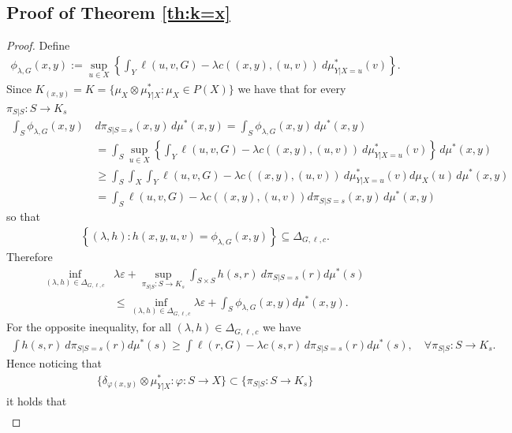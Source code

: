\documentclass{article}
\newcommand{\D}{\Delta_{G,\ell, c}}
\newcommand{\phifix}{\phi_{\lambda, G}}
\theoremstyle{definition}
\theoremstyle{remarksty}
\begin{document}
\subsection{Proof of Theorem \ref{th:k=x}}\label{supp:p(x)-duality-proof}
\begin{proof}
Define 
\begin{align*}
\phifix (x,y) := \sup_{u \in X} \left\{\int_Y \ell (u, v, G) - \lambda c((x,y),(u,v))\ d\mu_{Y|X=u}^*(v) \right\}.
\end{align*}
Since $K_{(x,y)} = K = \{\mu_X \otimes \mu^*_{Y|X}: \mu_X \in P(X)\}$ we have that for every $\pi_{S|S} : S \rightarrow K_s$ 
\begin{align*}
    \int_S \phifix (x,y) \, & d\pi_{S|S=s}(x,y) \,d\mu^*(x,y)  = \int_S \phifix (x,y)\,d\mu^*(x,y) \\
    & = \int_S \sup_{u \in X} \left\{\int_Y \ell (u, v, G) - \lambda c((x,y),(u,v))\ d\mu_{Y|X=u}^*(v) \right\} \,d\mu^*(x,y)\\
    & \geq \int_S \int_X\int_Y \ell (u, v, G) - \lambda c((x,y),(u,v))\ d\mu_{Y|X=u}^*(v)  d\mu_X(u)\,d\mu^*(x,y)\\
    & = \int_S  \ell (u, v, G) - \lambda c((x,y),(u,v)) d\pi_{S|S=s}(x,y) \,d\mu^*(x,y)
\end{align*}
so that 
\begin{align*}
        \left\{(\lambda, h): h(x,y,u,v) = \phifix(x,y) \right\} \subseteq \D.
    \end{align*}
    Therefore
    \begin{align}
        \inf_{(\lambda, h) \in \D} &\lambda \varepsilon + \sup_{\pi_{S|S} : S \rightarrow K_s} \int_{S \times S}  h(s,r) \ d\pi_{S|S=s}(r)d\mu^*(s) \nonumber \\
        &\leq  \inf_{(\lambda, h) \in \D} \lambda \varepsilon +  \int_S  \phifix (x,y) d\mu^*(x,y).  \label{eq:kx-lhs}
    \end{align}
    For the opposite inequality, for all $(\lambda, h) \in \D$ we have
    \begin{align*}
        \int h(s,r)\ d\pi_{S|S=s}(r) d\mu^*(s) \geq \int \ell(r,G) - \lambda c(s,r) \,  d\pi_{S|S=s}(r) d\mu^*(s), \quad \forall \pi_{S|S} : S \rightarrow K_s.
    \end{align*}
    Hence noticing that 
    \begin{align*}
        \{\delta_{\varphi(x,y)} \otimes \mu^*_{Y|X}   : \varphi: S \rightarrow X\} \subset \{\pi_{S|S} : S \rightarrow K_s\}
    \end{align*}
   it holds that 
   \begin{align*}

\end{align*}
\end{proof}
\end{document}
